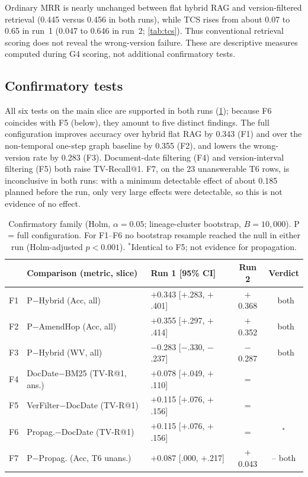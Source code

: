 \documentclass[sigconf,anonymous,review]{acmart}
\newcommand{\cmark}{\textcolor{cGreen}{\ding{51}}}
\begin{document}
Ordinary MRR is nearly unchanged between flat hybrid RAG and version-filtered retrieval (0.445 versus 0.456 in both runs), while TCS rises from about 0.07 to 0.65 in run~1 (0.047 to 0.646 in run~2; \cref{tab:tcs}). Thus conventional retrieval scoring does not reveal the wrong-version failure. These are descriptive measures computed during G4 scoring, not additional confirmatory tests.

\subsection{Confirmatory tests}

All six tests on the main slice are supported in both runs (\cref{tab:confirm}); because F6 coincides with F5 (below), they amount to five distinct findings. The full configuration improves accuracy over hybrid flat RAG by 0.343 (F1) and over the non-temporal one-step graph baseline by 0.355 (F2), and lowers the wrong-version rate by 0.283 (F3). Document-date filtering (F4) and version-interval filtering (F5) both raise TV-Recall@1. F7, on the 23 unanswerable T6 rows, is inconclusive in both runs: with a minimum detectable effect of about 0.185 planned before the run, only very large effects were detectable, so this is not evidence of no effect.

\begin{table}[t]
\centering
\caption{Confirmatory family (Holm, $\alpha=0.05$; lineage-cluster bootstrap, $B=10{,}000$). P = full configuration. For F1--F6 no bootstrap resample reached the null in either run (Holm-adjusted $p<0.001$). $^\ast$Identical to F5; not evidence for propagation.}
\label{tab:confirm}
\setlength{\tabcolsep}{2.0pt}
\scriptsize
\begin{tabular}{@{}l l l c c@{}}
\toprule
 & Comparison (metric, slice) & Run 1 [95\% CI] & Run 2 & Verdict \\
\midrule
F1 & P$-$Hybrid (Acc, all) & $+$0.343 [$+$.283, $+$.401] & $+$0.368 & \cmark\ both \\
F2 & P$-$AmendHop (Acc, all) & $+$0.355 [$+$.297, $+$.414] & $+$0.352 & \cmark\ both \\
F3 & P$-$Hybrid (WV, all) & $-$0.283 [$-$.330, $-$.237] & $-$0.287 & \cmark\ both \\
F4 & DocDate$-$BM25 (TV-R@1, ans.) & $+$0.078 [$+$.049, $+$.110] & = & \cmark \\
F5 & VerFilter$-$DocDate (TV-R@1) & $+$0.115 [$+$.076, $+$.156] & = & \cmark \\
F6 & Propag.$-$DocDate (TV-R@1) & $+$0.115 [$+$.076, $+$.156] & = & \cmark$^\ast$ \\
F7 & P$-$Propag. (Acc, T6 unans.) & $+$0.087 [.000, $+$.217] & $+$0.043 & -- both \\
\bottomrule
\end{tabular}
\end{table}
\end{document}

